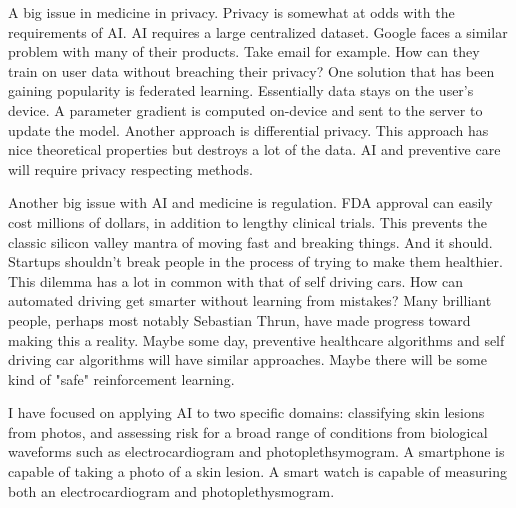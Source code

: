 A big issue in medicine in privacy.  Privacy is somewhat at odds with the requirements of AI.  AI requires a large centralized dataset.  Google faces a similar problem with many of their products.  Take email for example.  How can they train on user data without breaching their privacy?  One solution that has been gaining popularity is federated learning.  Essentially data stays on the user's device.  A parameter gradient is computed on-device and sent to the server to update the model.  Another approach is differential privacy.  This approach has nice theoretical properties but destroys a lot of the data.  AI and preventive care will require privacy respecting methods.

Another big issue with AI and medicine is regulation.  FDA approval can easily cost millions of dollars, in addition to lengthy clinical trials.  This prevents the classic silicon valley mantra of moving fast and breaking things.  And it should.  Startups shouldn't break people in the process of trying to make them healthier.  This dilemma has a lot in common with that of self driving cars.  How can automated driving get smarter without learning from mistakes?  Many brilliant people, perhaps most notably Sebastian Thrun, have made progress toward making this a reality.  Maybe some day, preventive healthcare algorithms and self driving car algorithms will have similar approaches.  Maybe there will be some kind of "safe" reinforcement learning.

I have focused on applying AI to two specific domains: classifying skin lesions from photos, and assessing risk for a broad range of conditions from biological waveforms such as electrocardiogram and photoplethsymogram.  A smartphone is capable of taking a photo of a skin lesion.  A smart watch is capable of measuring both an electrocardiogram and photoplethysmogram.

